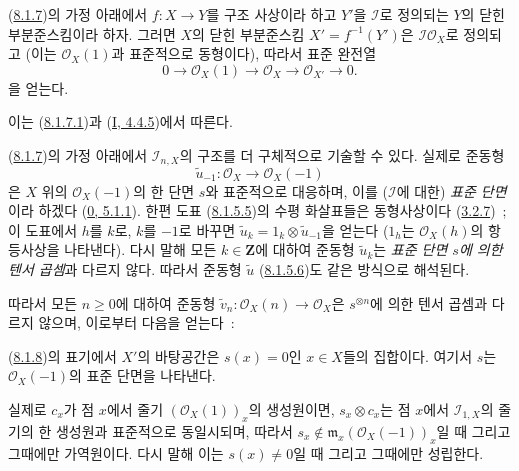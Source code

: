 \begin{corollary}[8.1.8]
\label{II.8.1.8-ko}
(\hyperref[II.8.1.7-ko]{8.1.7})의 가정 아래에서 $f:X\to Y$를 구조
사상이라 하고 $Y'$을 $\mathcal{I}$로 정의되는 $Y$의 닫힌
부분준스킴이라 하자. 그러면 $X$의 닫힌 부분준스킴
$X'=f^{-1}(Y')$은 $\mathcal{I}\mathcal{O}_X$로 정의되고
(이는 $\mathcal{O}_X(1)$과 표준적으로
동형이다), 따라서 표준 완전열
\begin{equation}
\label{II.8.1.8.1-ko}
  0\to\mathcal{O}_X(1)\to\mathcal{O}_X\to\mathcal{O}_{X'}\to0.
\tag{8.1.8.1}
\end{equation}
을 얻는다.
\end{corollary}

이는 (\hyperref[II.8.1.7.1-ko]{8.1.7.1})과
(\hyperref[I.4.4.5-ko]{I, 4.4.5})에서 따른다.

\begin{env}[8.1.9]
\label{II.8.1.9-ko}
(\hyperref[II.8.1.7-ko]{8.1.7})의 가정 아래에서
$\mathcal{I}_{n,X}$의 구조를 더 구체적으로 기술할 수 있다. 실제로
준동형
\[
  \widetilde{u}_{-1}:\mathcal{O}_X\to\mathcal{O}_X(-1)
\]
은 $X$ 위의 $\mathcal{O}_X(-1)$의 한 단면 $s$와 표준적으로 대응하며,
이를 ($\mathcal{I}$에 대한) \emph{표준 단면}이라 하겠다
(\hyperref[0.5.1.1-ko]{0, 5.1.1}). 한편 도표
(\hyperref[II.8.1.5.5-ko]{8.1.5.5})의 수평 화살표들은 동형사상이다
(\hyperref[II.3.2.7-ko]{3.2.7})~; 이 도표에서 $h$를 $k$로, $k$를
$-1$로 바꾸면
$\widetilde{u}_k=1_k\otimes\widetilde{u}_{-1}$을 얻는다
($1_h$는 $\mathcal{O}_X(h)$의 항등사상을 나타낸다). 다시 말해 모든
$k\in\mathbf{Z}$에 대하여 준동형 $\widetilde{u}_k$는 \emph{표준 단면
$s$에 의한 텐서 곱셈}과 다르지 않다. 따라서 준동형
$\widetilde{u}$ (\hyperref[II.8.1.5.6-ko]{8.1.5.6})도 같은 방식으로
해석된다.

따라서 모든 $n\geq0$에 대하여 준동형
$\widetilde{v}_n:\mathcal{O}_X(n)\to\mathcal{O}_X$은
$s^{\otimes n}$에 의한 텐서 곱셈과 다르지 않으며, 이로부터 다음을
얻는다~:
\end{env}

\begin{corollary}[8.1.10]
\label{II.8.1.10-ko}
(\hyperref[II.8.1.8-ko]{8.1.8})의 표기에서 $X'$의 바탕공간은
$s(x)=0$인 $x\in X$들의 집합이다. 여기서 $s$는
$\mathcal{O}_X(-1)$의 표준 단면을 나타낸다.
\end{corollary}

실제로 $c_x$가 점 $x$에서 줄기 $(\mathcal{O}_X(1))_x$의 생성원이면,
$s_x\otimes c_x$는 점 $x$에서 $\mathcal{I}_{1,X}$의 줄기의 한
생성원과 표준적으로 동일시되며, 따라서
$s_x\notin\mathfrak{m}_x(\mathcal{O}_X(-1))_x$일 때 그리고 그때에만
가역원이다. 다시 말해 이는 $s(x)\neq0$일 때 그리고 그때에만
성립한다.

